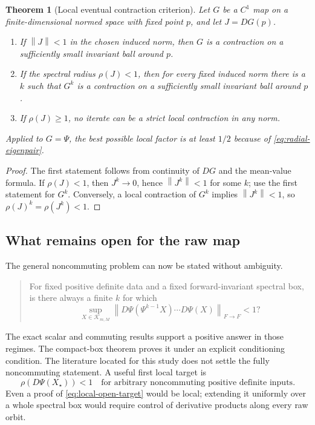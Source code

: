 \documentclass[11pt]{article}
\newtheorem{theorem}{Theorem}[section]
\theoremstyle{definition}
\newcommand{\rhoop}{\rho}
\newcommand{\cK}{\mathcal K}
\newcommand{\norm}[1]{\left\lVert #1\right\rVert}
\begin{document}
\begin{theorem}[Local eventual contraction criterion]\label{thm:local-criterion}
Let $G$ be a $C^1$ map on a finite-dimensional normed space with fixed point
$p$, and let $J=DG(p)$.
\begin{enumerate}
  \item If $\norm J<1$ in the chosen induced norm, then $G$ is a contraction
  on a sufficiently small invariant ball around $p$.
  \item If the spectral radius $\rhoop(J)<1$, then for every fixed induced
  norm there is a $k$ such that $G^k$ is a contraction on a sufficiently small
  invariant ball around $p$.
  \item If $\rhoop(J)\geq1$, no iterate can be a strict local contraction in
  any norm.
\end{enumerate}
Applied to $G=\Psi$, the best possible local factor is at least $1/2$ because
of \eqref{eq:radial-eigenpair}.
\end{theorem}

\begin{proof}
The first statement follows from continuity of $DG$ and the mean-value
formula.  If $\rhoop(J)<1$, then $J^k\to0$, hence $\norm{J^k}<1$ for some
$k$; use the first statement for $G^k$.  Conversely, a local contraction of
$G^k$ implies $\norm{J^k}<1$, so
$\rhoop(J)^k=\rhoop(J^k)<1$.
\end{proof}

\subsection{What remains open for the raw map}

The general noncommuting problem can now be stated without ambiguity.

\begin{quote}
For fixed positive definite data and a fixed forward-invariant spectral box,
is there always a finite $k$ for which
\[
 \sup_{X\in\cK_{m,M}}
 \norm{D\Psi(\Psi^{k-1}X)\cdots D\Psi(X)}_{F\to F}<1?
\]
\end{quote}

The exact scalar and commuting results support a positive answer in those
regimes.  The compact-box theorem proves it under an explicit conditioning
condition.  The literature located for this study does not settle the fully
noncommuting statement.  A useful first local target is
\begin{equation}\label{eq:local-open-target}
 \rhoop(D\Psi(X_\star))<1
 \quad\text{for arbitrary noncommuting positive definite inputs}.
\end{equation}
Even a proof of \eqref{eq:local-open-target} would be local; extending it
uniformly over a whole spectral box would require control of derivative
products along every raw orbit.
\end{document}
